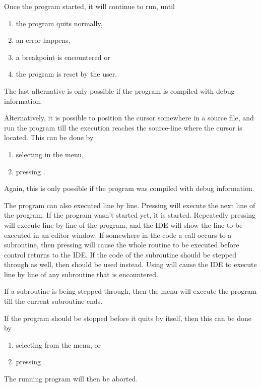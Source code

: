 
Once the program started, it will continue to run, until 
\begin{enumerate}
\item the program quits normally,
\item an error happens,
\item a breakpoint is encountered or
\item the program is reset by the user.
\end{enumerate}
The last alternative is only possible if the program is compiled
with debug information.

Alternatively, it is possible to position the cursor somewhere in a
source file, and run the program till the execution reaches the
source-line where the cursor is located. This can be done by
\begin{enumerate}
\item selecting  in the menu,
\item pressing .
\end{enumerate}
Again, this is only possible if the program was compiled with debug
information.

The program can also executed line by line. Pressing  will 
execute the next line of the program. If the program wasn't started
yet, it is started. Repeatedly pressing  will execute line 
by line of the program, and the IDE will show the line to be executed 
in an editor window. If somewhere in the code a call occurs to a subroutine,
then pressing  will cause the whole routine to be executed before
control returns to the IDE. If the code of the subroutine should be stepped
through as well, then  should be used instead. Using  will
cause the IDE to execute line by line of any subroutine that is encountered.

If a subroutine is being stepped through, then the  menu
will execute the program till the current subroutine ends. 

If the program should be stopped before it quits by itself, then this can be
done by
\begin{enumerate}
\item selecting  from the menu, or
\item pressing .
\end{enumerate}
The running program will then be aborted.

